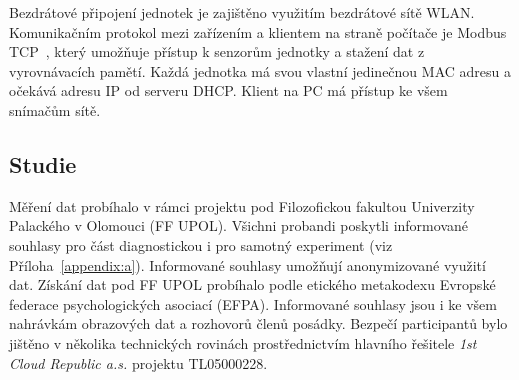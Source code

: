 Bezdrátové připojení jednotek je zajištěno využitím bezdrátové sítě WLAN.
Komunikačním protokol mezi zařízením a klientem na straně počítače je Modbus
TCP~\cite{modbus}, který umožňuje přístup k senzorům jednotky a stažení dat z
vyrovnávacích pamětí. Každá jednotka má svou vlastní jedinečnou MAC adresu a
očekává adresu IP od serveru DHCP. Klient na PC má přístup ke všem snímačům
sítě.

\subsection{Studie}
\label{subsec:studie}
Měření dat probíhalo v rámci projektu pod Filozofickou fakultou Univerzity
Palackého v Olomouci (\gls{FF UPOL}). Všichni probandi poskytli informované
souhlasy pro část diagnostickou i pro samotný experiment (viz
Příloha~\ref{appendix:a}). Informované souhlasy umožňují anonymizované využití
dat. Získání dat pod FF UPOL probíhalo podle etického metakodexu Evropské
federace psychologických asociací (\gls{EFPA}). Informované souhlasy jsou i ke
všem nahrávkám obrazových dat a rozhovorů členů posádky. Bezpečí participantů
bylo jištěno v několika technických rovinách prostřednictvím hlavního řešitele
\textit{1st Cloud Republic a.s.} projektu TL05000228.